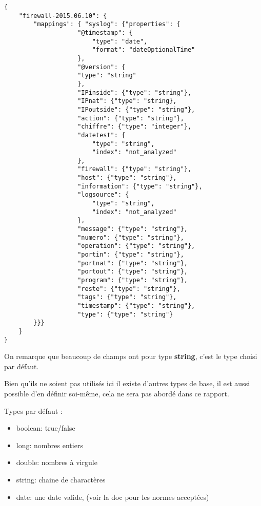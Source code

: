 \begin{lstlisting}[style=code,label={lst:mappingresult},caption={Exemple de mapping}]
{
    "firewall-2015.06.10": {
        "mappings": { "syslog": {"properties": {
                    "@timestamp": {
                        "type": "date",
                        "format": "dateOptionalTime"
                    },
                    "@version": {
                    "type": "string"
                    },
                    "IPinside": {"type": "string"},
                    "IPnat": {"type": "string},
                    "IPoutside": {"type": "string"},
                    "action": {"type": "string"},
                    "chiffre": {"type": "integer"},
                    "datetest": {
                        "type": "string",
                        "index": "not_analyzed"
                    },
                    "firewall": {"type": "string"},
                    "host": {"type": "string"},
                    "information": {"type": "string"},
                    "logsource": {
                        "type": "string",
                        "index": "not_analyzed"
                    },
                    "message": {"type": "string"},
                    "numero": {"type": "string"},
                    "operation": {"type": "string"},
                    "portin": {"type": "string"},
                    "portnat": {"type": "string"},
                    "portout": {"type": "string"},
                    "program": {"type": "string"},
                    "reste": {"type": "string"},
                    "tags": {"type": "string"},
                    "timestamp": {"type": "string"},
                    "type": {"type": "string"}
        }}}
    }
}
\end{lstlisting}


On remarque que beaucoup de champs ont pour type \textbf{string}, c'est le type choisi
par défaut.

Bien qu'ils ne soient pas utilisés ici il existe d'autres types de base, il est aussi
possible d'en définir soi-même, cela ne sera pas abordé dans ce rapport.

Types par défaut :
\begin{itemize}
    \item   boolean: true/false
    \item   long: nombres entiers
    \item   double: nombres à virgule
    \item   string: chaine de charactères
    \item   date:   une date valide, (voir la doc pour les normes acceptées)
\end{itemize}

